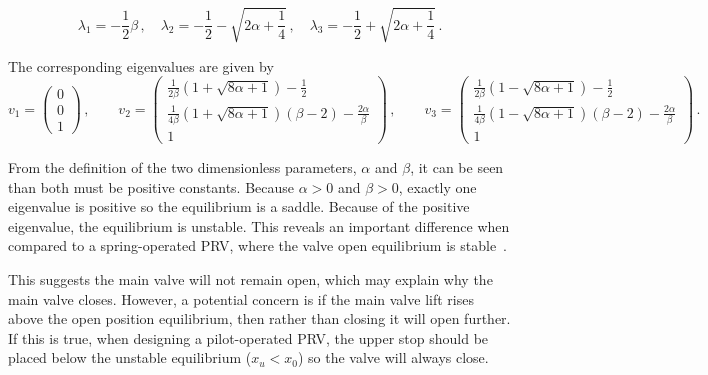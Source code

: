 \begin{equation*}
\lambda_1 = - \frac{1}{2} \beta \, , \quad
\lambda_2 = - \frac{1}{2} - \sqrt{2 \alpha + \frac{1}{4}} \, , \quad \lambda_3 = - \frac{1}{2} + \sqrt{2 \alpha + \frac{1}{4}} \, .
\end{equation*}

The corresponding eigenvalues are given by
~
\begin{equation*}
    v_1 = \begin{pmatrix}
    0 \\ 0 \\ 1
    \end{pmatrix} \, , \qquad
    v_2 = \begin{pmatrix}
    \frac{1}{2\beta} \left( 1 + \sqrt{8\alpha+1} \right) - \frac{1}{2} \\ \frac{1}{4\beta} \left( 1 + \sqrt{8\alpha+1} \right) \left( \beta - 2 \right) - \frac{2\alpha}{\beta} \\ 1
    \end{pmatrix} \, , \qquad
    v_3 = \begin{pmatrix}
    \frac{1}{2\beta} \left( 1 - \sqrt{8\alpha+1} \right) - \frac{1}{2} \\ \frac{1}{4\beta} \left( 1 - \sqrt{8\alpha+1} \right) \left( \beta - 2 \right) - \frac{2\alpha}{\beta} \\ 1
    \end{pmatrix} \, .
\end{equation*}

From the definition of the two dimensionless parameters, $\alpha$ and $\beta$, it can be seen than both must be positive constants. Because $\alpha > 0$ and $\beta > 0$, exactly one eigenvalue is positive so the equilibrium is a saddle. Because of the positive eigenvalue, the equilibrium is unstable. This reveals an important difference when compared to a spring-operated PRV, where the valve open equilibrium is stable~\cite{Hos2014DynamicMechanisms}.

This suggests the main valve will not remain open, which may explain why the main valve closes. However, a potential concern is if the main valve lift rises above the open position equilibrium, then rather than closing it will open further. If this is true, when designing a pilot-operated PRV, the upper stop should be placed below the unstable equilibrium ($x_u < x_0$) so the valve will always close. %

